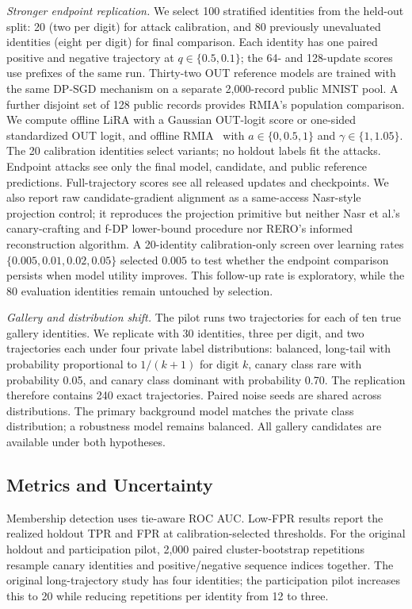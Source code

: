 \documentclass[conference]{IEEEtran}
\begin{document}
\emph{Stronger endpoint replication.} We select 100 stratified identities from the held-out split: 20 (two per digit) for attack calibration, and 80 previously unevaluated identities (eight per digit) for final comparison. Each identity has one paired positive and negative trajectory at $q\in\{0.5,0.1\}$; the 64- and 128-update scores use prefixes of the same run. Thirty-two OUT reference models are trained with the same DP-SGD mechanism on a separate 2,000-record public MNIST pool. A further disjoint set of 128 public records provides RMIA's population comparison. We compute offline LiRA with a Gaussian OUT-logit score or one-sided standardized OUT logit, and offline RMIA~\cite{carlini2022membership,zarifzadeh2024lowcost} with $a\in\{0,0.5,1\}$ and $\gamma\in\{1,1.05\}$. The 20 calibration identities select variants; no holdout labels fit the attacks. Endpoint attacks see only the final model, candidate, and public reference predictions. Full-trajectory scores see all released updates and checkpoints. We also report raw candidate-gradient alignment as a same-access Nasr-style projection control; it reproduces the projection primitive but neither Nasr et al.'s canary-crafting and f-DP lower-bound procedure nor RERO's informed reconstruction algorithm. A 20-identity calibration-only screen over learning rates $\{0.005,0.01,0.02,0.05\}$ selected $0.005$ to test whether the endpoint comparison persists when model utility improves. This follow-up rate is exploratory, while the 80 evaluation identities remain untouched by selection.

\emph{Gallery and distribution shift.} The pilot runs two trajectories for each of ten true gallery identities. We replicate with 30 identities, three per digit, and two trajectories each under four private label distributions: balanced, long-tail with probability proportional to $1/(k+1)$ for digit $k$, canary class rare with probability 0.05, and canary class dominant with probability 0.70. The replication therefore contains 240 exact trajectories. Paired noise seeds are shared across distributions. The primary background model matches the private class distribution; a robustness model remains balanced. All gallery candidates are available under both hypotheses.

\subsection{Metrics and Uncertainty}

Membership detection uses tie-aware ROC AUC. Low-FPR results report the realized holdout TPR and FPR at calibration-selected thresholds. For the original holdout and participation pilot, 2,000 paired cluster-bootstrap repetitions resample canary identities and positive/negative sequence indices together. The original long-trajectory study has four identities; the participation pilot increases this to 20 while reducing repetitions per identity from 12 to three.
\end{document}
